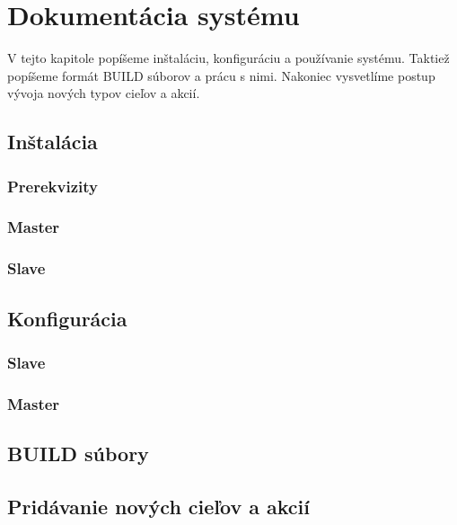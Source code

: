 \chapter{Dokument\'{a}cia syst\'{e}mu}
\label{ch:doc}

V tejto kapitole popíšeme inštaláciu, konfiguráciu a používanie systému. Taktiež
popíšeme formát BUILD súborov a prácu s nimi. Nakoniec vysvetlíme postup vývoja
nových typov cieľov a akcií.

\section{In\v{s}tal\'{a}cia}
\label{sec:installation}

\subsection{Prerekvizity}
\label{sec:installation:dependencies}

\subsection{Master}
\label{sec:installation:master}

\subsection{Slave}
\label{sec:installation:slave}

\section{Konfigur\'{a}cia}
\label{sec:configuration}

\subsection{Slave}
\label{sec:configuration:slave}

\subsection{Master}
\label{sec:configuration:master}

\section{BUILD s\'{u}bory}
\label{sec:buildfiles}

\section{Prid\'{a}vanie nov\'{y}ch cie\v{l}ov a akci\'{i}}
\label{sec:contributing}
